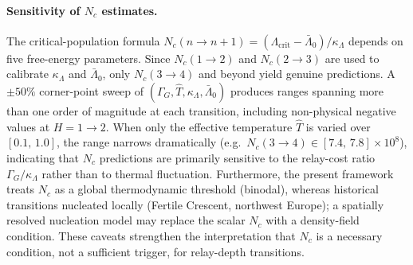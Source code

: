 \documentclass[11pt]{article}
\begin{document}
\paragraph{Sensitivity of $N_c$ estimates.}
The critical-population formula $N_c(n\to n{+}1) = (\Lambda_{\mathrm{crit}} - \bar\Lambda_0)/\kappa_\Lambda$
depends on five free-energy parameters.  Since $N_c(1\to 2)$ and $N_c(2\to 3)$
are used to calibrate $\kappa_\Lambda$ and $\bar\Lambda_0$, only
$N_c(3\to 4)$ and beyond yield genuine predictions.
A $\pm 50\%$ corner-point sweep of $(\Gamma_G,\hat T,\kappa_\Lambda,
\bar\Lambda_0)$ produces ranges spanning more than one order of magnitude
at each transition, including non-physical negative values at $H=1\to 2$.
When only the effective temperature $\hat T$ is varied over $[0.1,\,1.0]$,
the range narrows dramatically (e.g.\ $N_c(3\to 4)\in[7.4,\,7.8]\times
10^8$), indicating that
$N_c$ predictions are primarily sensitive to the relay-cost ratio
$\Gamma_G/\kappa_\Lambda$ rather than to thermal fluctuation.
Furthermore, the present framework treats $N_c$ as a global thermodynamic
threshold (binodal), whereas historical transitions nucleated locally
(Fertile Crescent, northwest Europe); a spatially resolved
nucleation model may replace the scalar $N_c$ with a density-field
condition.  These caveats strengthen the interpretation that $N_c$
is a necessary condition, not a sufficient trigger, for relay-depth
transitions.

\end{document}
